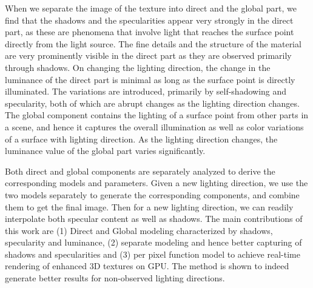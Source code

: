 When we separate the image of the texture into direct and the global part, we find
that the shadows and the specularities appear very strongly in the direct part,
as these are phenomena that involve light that reaches the surface point
directly from the light source. The fine details and the structure of the
material are very prominently visible in the direct part as they are observed
primarily through shadows. On changing the lighting direction, the change in the
luminance of the direct part is minimal as long as the surface point is directly
illuminated. The variations are introduced, primarily by self-shadowing and
specularity, both of which are abrupt changes as the lighting direction changes.
The global component contains the lighting of a surface point from other
parts in a scene, and hence it captures the overall illumination as well as
color variations of a surface with lighting direction. As the lighting direction
changes, the luminance value of the global part varies significantly.

Both direct and global components are separately analyzed to derive the
corresponding models and parameters. Given a new lighting direction, we use the
two models separately to generate the corresponding components, and combine them
to get the final image. Then for a new lighting direction, we can readily
interpolate both specular content as well as shadows.
The main contributions of this work are (1) Direct and Global modeling characterized by
shadows, specularity and luminance, 
(2) separate modeling and hence better capturing of shadows and specularities 
and (3) per pixel function model to
achieve real-time rendering of enhanced 3D textures on GPU.
The method is shown to indeed
generate better results for non-observed lighting directions.


